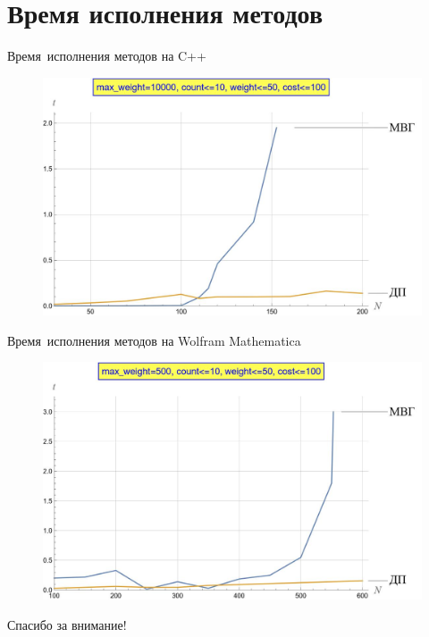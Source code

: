 \documentclass[ignoreonframetext,unicode]{beamer}
\begin{document}
	
	\section{Время исполнения методов}
	\begin{frame}{Время исполнения методов на C++}
			\begin{figure}[H]
			\centering
			\includegraphics[scale=0.5]{plot4}
		\end{figure}	
	\end{frame}
	
	\begin{frame}{Время исполнения методов на Wolfram Mathematica}
		\begin{figure}[H]
			\centering
			\includegraphics[scale=0.5]{plot5}
		\end{figure}	
	\end{frame}
	
	\begin{frame}
		\LARGE
		\centering
		Спасибо за внимание!
	\end{frame}
	
\end{document}
